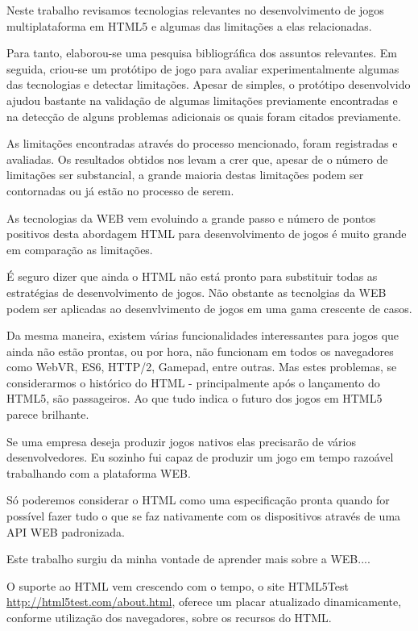 \begin{draft}

Neste trabalho revisamos tecnologias relevantes no desenvolvimento
de jogos multiplataforma em HTML5 e algumas das limitações a elas
relacionadas.

Para tanto, elaborou-se uma pesquisa bibliográfica
dos assuntos relevantes. Em seguida, criou-se um protótipo de jogo
para avaliar experimentalmente algumas das tecnologias e detectar
limitações. Apesar de simples, o protótipo desenvolvido ajudou
bastante na validação de algumas limitações previamente encontradas
e na detecção de alguns problemas adicionais os quais foram citados
previamente.

As limitações encontradas através do processo mencionado, foram
registradas e avaliadas. Os resultados obtidos nos levam a crer que,
apesar de o número de limitações ser substancial, a grande maioria
destas limitações podem ser contornadas ou já estão no processo de
serem.

As tecnologias da WEB vem evoluindo a grande passo e número de pontos
positivos desta abordagem HTML para desenvolvimento de jogos é muito
grande em comparação as limitações.

É seguro dizer que ainda o HTML não está pronto para substituir todas
as estratégias de desenvolvimento de jogos. Não obstante as tecnolgias
da WEB podem ser aplicadas ao desenvlvimento de jogos em uma gama
crescente de casos.

Da mesma maneira, existem várias funcionalidades interessantes para
jogos que ainda não estão prontas, ou por hora, não funcionam em
todos os navegadores como WebVR, ES6, HTTP/2, Gamepad, entre outras. Mas
estes problemas, se considerarmos o histórico do HTML - principalmente
após o lançamento do HTML5, são passageiros. Ao que tudo indica o
futuro dos jogos em HTML5 parece brilhante.

Se uma empresa deseja produzir jogos nativos elas precisarão de vários
desenvolvedores. Eu sozinho fui capaz de produzir um jogo em tempo
razoável trabalhando com a plataforma WEB.

Só poderemos considerar o HTML como uma especificação pronta quando
for possível fazer tudo o que se faz nativamente com os dispositivos
através de uma API WEB padronizada.


Este trabalho surgiu da minha vontade de aprender mais sobre a WEB....

O suporte ao HTML vem crescendo com o tempo, o site HTML5Test
\url{http://html5test.com/about.html}, oferece um placar atualizado
dinamicamente, conforme utilização dos navegadores, sobre os recursos
do HTML.


\end{draft}
